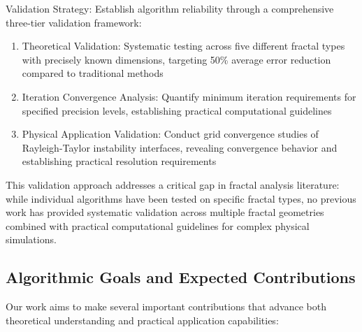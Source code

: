 \documentclass[preprint,12pt]{elsarticle}
\def\textbf#1{#1}%
\begin{document}
\textbf{Validation Strategy}: Establish algorithm reliability through a comprehensive three-tier validation framework:

\begin{enumerate}
\item \textbf{Theoretical Validation}: Systematic testing across five different fractal types with precisely known dimensions, targeting 50\% average error reduction compared to traditional methods

\item \textbf{Iteration Convergence Analysis}: Quantify minimum iteration requirements for specified precision levels, establishing practical computational guidelines

\item \textbf{Physical Application Validation}: Conduct grid convergence studies of Rayleigh-Taylor instability interfaces, revealing convergence behavior and establishing practical resolution requirements
\end{enumerate}

This validation approach addresses a critical gap in fractal analysis literature: while individual algorithms have been tested on specific fractal types, no previous work has provided systematic validation across multiple fractal geometries combined with practical computational guidelines for complex physical simulations.

\subsection{Algorithmic Goals and Expected Contributions}

Our work aims to make several important contributions that advance both theoretical understanding and practical application capabilities:
\end{document}
